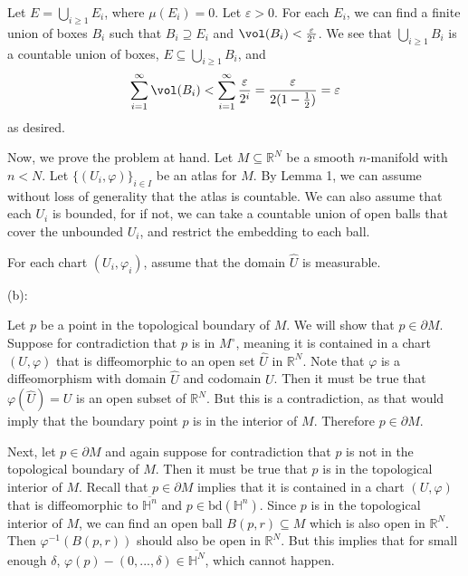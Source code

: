 \documentclass{../../../tex-setup/eh-homework}
\begin{document}
\begin{question}{42}
        Let \(E = \bigcup_{i \geq 1} E_i\), where \(\mu (E_i) = 0\). Let \(\varepsilon > 0\). For each \(E_i\), we can find a finite union of boxes \(B_i\) such that \(B_i \supseteq E_i\) and \(\vol (B_i) < \frac{\varepsilon}{2^i}\). We see that \(\bigcup_{i\geq1}B_i\) is a countable union of boxes, \(E \subseteq \bigcup_{i\geq1}B_i\), and
        \[
            \sum_{i = 1}^{\infty} \vol (B_i) < \sum_{i=1}^{\infty} \frac{\varepsilon}{2^i} = \frac{\varepsilon}{2(1 - \frac{1}{2})} = \varepsilon
        \]
        as desired.

        \medskip

        Now, we prove the problem at hand. Let \(M \subseteq \mathbb{R}^N\) be a smooth \(n\)-manifold with \(n < N\). Let \(\{ (U_i, \varphi)\}_{i \in I}\) be an atlas for \(M\). By Lemma 1, we can assume without loss of generality that the atlas is countable. We can also assume that each \(U_i\) is bounded, for if not, we can take a countable union of open balls that cover the unbounded \(U_i\), and restrict the embedding to each ball.

        For each chart \((U_i, \varphi_i)\), assume that the domain \(\hat{U}\) is measurable. 

        \medskip

        (b):

        Let \(p\) be a point in the topological boundary of \(M\). We will show that \(p \in \partial M\). Suppose for contradiction that \(p\) is in \(M^\circ\), meaning it is contained in a chart \((U, \varphi)\) that is diffeomorphic to an open set \(\hat{U}\) in \(\mathbb{R}^N\). Note that \(\varphi\) is a diffeomorphism with domain \(\hat{U}\) and codomain \(U\). Then it must be true that \(\varphi (\hat{U}) = U\) is an open subset of \(\mathbb{R}^N\). But this is a contradiction, as that would imply that the boundary point \(p\) is in the interior of \(M\). Therefore \(p \in \partial M\).

        Next, let \(p \in \partial M\) and again suppose for contradiction that \(p\) is not in the topological boundary of \(M\). Then it must be true that \(p\) is in the topological interior of \(M\). Recall that \(p \in \partial M\) implies that it is contained in a chart \((U, \varphi)\) that is diffeomorphic to \(\overline{\mathbb{H}^n}\) and \(p \in \mathrm{bd} (\mathbb{H}^n)\). Since \(p\) is in the topological interior of \(M\), we can find an open ball \(B(p, r) \subseteq M\) which is also open in \(\mathbb{R}^N\). Then \(\varphi ^{-1}(B(p,r))\) should also be open in \(\mathbb{R}^N\). But this implies that for small enough \(\delta\), \(\varphi (p) - (0, ..., \delta) \in \overline{\mathbb{H}^N}\), which cannot happen.


\end{question}
\end{document}
